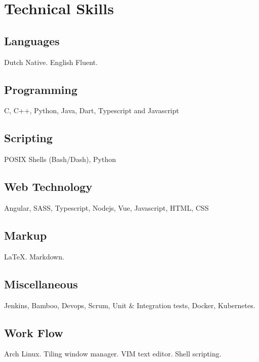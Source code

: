\section{Technical Ski\textcolor{mycolor}{lls}}
  \subsection{Languages} 
  Dutch \textcolor{mycolor}{Native}. English \textcolor{mycolor}{Fluent}.
  \subsection{Programming}
    C, C++, Python, Java, Dart, Typescript and Javascript
  \subsection{Scripting}
    POSIX Shells (Bash/Dash), Python
  \subsection{Web Technology}
    Angular, SASS, Typescript, Nodejs, Vue, Javascript, HTML, CSS
  \subsection{Markup}
    {\LaTeX}. Markdown.
  \subsection{Miscellaneous}
    Jenkins, Bamboo, Devops, Scrum, Unit \& Integration tests, Docker, Kubernetes.
  \subsection{Work Flow}
    Arch Linux. Tiling window manager. VIM text editor. Shell scripting.